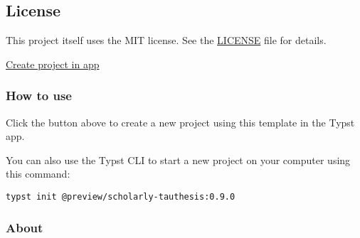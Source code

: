 \subsection{License}\label{license}

This project itself uses the MIT license. See the
\href{https://github.com/typst/packages/raw/main/packages/preview/scholarly-tauthesis/0.9.0/LICENSE}{LICENSE}
file for details.

\href{/app?template=scholarly-tauthesis&version=0.9.0}{Create project in
app}

\subsubsection{How to use}\label{how-to-use}

Click the button above to create a new project using this template in
the Typst app.

You can also use the Typst CLI to start a new project on your computer
using this command:

\begin{verbatim}
typst init @preview/scholarly-tauthesis:0.9.0
\end{verbatim}



\subsubsection{About}\label{about}

